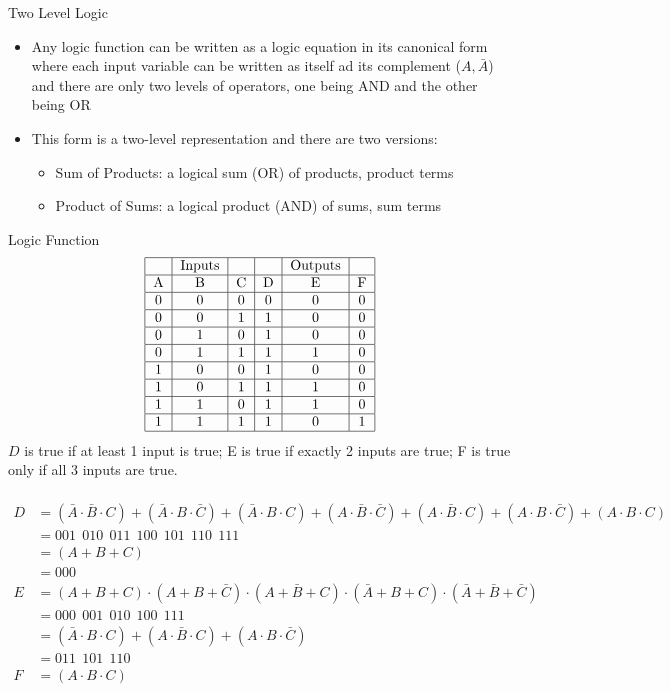 \documentclass[12pt]{article}
\begin{document}
Two Level Logic \begin{itemize} 
\item Any logic function can be written as a logic equation in its canonical form where each input variable can be written as itself ad its complement ($A, \bar{A}$) and there are only two levels of operators, one being AND and the other being OR 
\item This form is a two-level representation and there are two versions: \begin{itemize} 
\item Sum of Products: a logical sum (OR) of products, product terms 
\item Product of Sums: a logical product (AND) of sums, sum terms 
\end{itemize} \end{itemize} 

Logic Function $$\begin{tabular}{|c|c|c|c|c|c|} \hline 
& Inputs & & & Outputs & \\ \hline 
A & B & C & D & E & F \\ \hline 
0&0&0&0&0&0 \\ \hline 
0&0&1&1&0&0 \\ \hline
0&1&0&1&0&0 \\ \hline 
0&1&1&1&1&0 \\ \hline 
1&0&0&1&0&0 \\ \hline 
1&0&1&1&1&0 \\ \hline 
1&1&0&1&1&0 \\ \hline 
1&1&1&1&0&1 \\ \hline \end{tabular} $$ 
$D$ is true if at least 1 input is true; E is true if exactly 2 inputs are true; F is true only if all 3 inputs are true. \\~\\
$$ \begin{aligned} D &= (\bar{A} \cdot \bar{B} \cdot C) + (\bar{A} \cdot B \cdot \bar{C}) + (\bar{A} \cdot B \cdot C) + (A \cdot \bar{B} \cdot \bar{C}) + (A \cdot \bar{B} \cdot C) + (A \cdot B \cdot \bar{C}) + (A \cdot B \cdot C) \\ &= 001 ~~010 ~~011 ~~100 ~~101 ~~110 ~~111 \\ &= (A + B + C) \\ &= 000 \\ E &= (A + B + C) \cdot (A + B + \bar{C}) \cdot (A + \bar{B} + C) \cdot (\bar{A} + B + C) \cdot (\bar{A} + \bar{B} + \bar{C}) \\ &= 000 ~~001 ~~010 ~~100 ~~111 \\ &= (\bar{A} \cdot B \cdot C) + (A \cdot \bar{B} \cdot C) + (A \cdot B \cdot \bar{C}) \\ &= 011 ~~101 ~~110 \\ F &= (A \cdot B \cdot C) \end{aligned} $$ 
\end{document}
